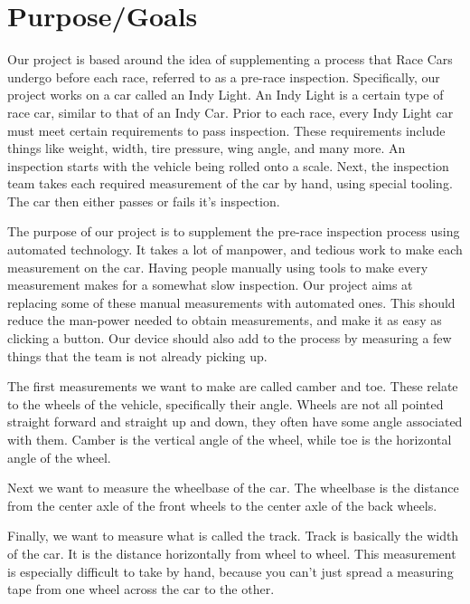 \documentclass[onecolumn, draftclsnofoot,10pt, compsoc]{IEEEtran}
\begin{document}
\section{Purpose/Goals}
Our project is based around the idea of supplementing a process that Race Cars undergo before each race, referred to as a pre-race inspection.  Specifically, our project works on a car called an Indy Light.  An Indy Light is a certain type of race car, similar to that of an Indy Car.  Prior to each race, every Indy Light car must meet certain requirements to pass inspection.  These requirements include things like weight, width, tire pressure, wing angle, and many more.  An inspection starts with the vehicle being rolled onto a scale.  Next, the inspection team takes each required measurement of the car by hand, using special tooling.  The car then either passes or fails it’s inspection.
\newline

\noindent The purpose of our project is to supplement the pre-race inspection process using automated technology.  It takes a lot of manpower, and tedious work to make each measurement on the car.  Having people manually using tools to make every measurement makes for a somewhat slow inspection.  Our project aims at replacing some of these manual measurements with automated ones.  This should reduce the man-power needed to obtain measurements, and make it as easy as clicking a button.  Our device should also add to the process by measuring a few things that the team is not already picking up.
\newline

\noindent The first measurements we want to make are called camber and toe.  These relate to the wheels of the vehicle, specifically their angle.  Wheels are not all pointed straight forward and straight up and down, they often have some angle associated with them. Camber is the vertical angle of the wheel, while toe is the horizontal angle of the wheel.
\newline

\noindent Next we want to measure the wheelbase of the car.  The wheelbase is the distance from the center axle of the front wheels to the center axle of the back wheels.
\newline

\noindent Finally,  we want to measure what is called the track.  Track is basically the width of the car.  It is the distance horizontally from wheel to wheel.  This measurement is especially difficult to take by hand, because you can't just spread a measuring tape from one wheel across the car to the other.
\newline
\end{document}
